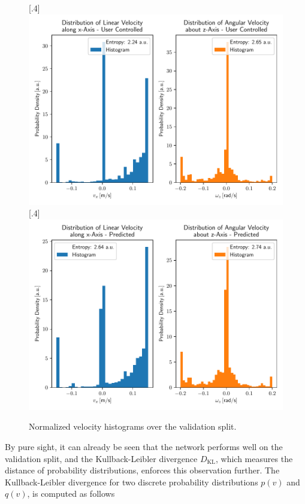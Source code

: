 \begin{figure}[h]
	\centering
	[.4\linewidth]{\includegraphics[scale=.35]{chapters/05_experiments/02_autonomous_walking/user_entropy.pdf}}
	[.4\linewidth]{\includegraphics[scale=.35]{chapters/05_experiments/02_autonomous_walking/predicted_entropy_kldivx_0_33_kldivz_0_06_imgs_13441_duration_4_ms.pdf}}
	\caption{Normalized velocity histograms over the validation split.}
	\label{fig::523_training_dist}
\end{figure}
By pure sight, it can already be seen that the network performs well on the validation split, and the Kullback-Leibler divergence $D_\text{KL}$, which measures the distance of probability distributions, enforces this observation further. The Kullback-Leibler divergence for two discrete probability distributions $p(v)$ and $q(v)$, is computed as follows
